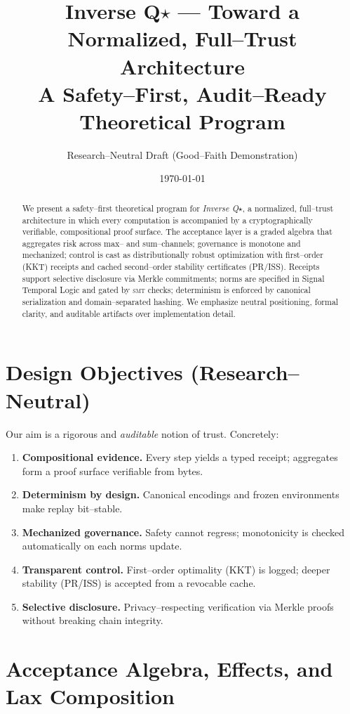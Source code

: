 \documentclass[11pt]{article}
\title{\vspace{-6pt}Inverse Q$\star$ --- Toward a Normalized, Full--Trust Architecture\\[2pt]
\large A Safety--First, Audit--Ready Theoretical Program}
\author{Research--Neutral Draft (Good--Faith Demonstration)}
\date{\today}
\theoremstyle{plain}
\theoremstyle{definition}
\theoremstyle{remark}
\begin{document}
\maketitle

\begin{abstract}
We present a safety--first theoretical program for \emph{Inverse Q$\star$}, a normalized, full--trust architecture in which every computation is accompanied by a cryptographically verifiable, compositional proof surface. The acceptance layer is a graded algebra that aggregates risk across max-- and sum--channels; governance is monotone and mechanized; control is cast as distributionally robust optimization with first--order (KKT) receipts and cached second--order stability certificates (PR/ISS). Receipts support selective disclosure via Merkle commitments; norms are specified in Signal Temporal Logic and gated by \textsc{smt} checks; determinism is enforced by canonical serialization and domain--separated hashing. We emphasize neutral positioning, formal clarity, and auditable artifacts over implementation detail.
\end{abstract}

\section{Design Objectives (Research--Neutral)}
Our aim is a rigorous and \emph{auditable} notion of trust. Concretely:
\begin{enumerate}[leftmargin=1.3em]
  \item \textbf{Compositional evidence.} Every step yields a typed receipt; aggregates form a proof surface verifiable from bytes.
  \item \textbf{Determinism by design.} Canonical encodings and frozen environments make replay bit--stable.
  \item \textbf{Mechanized governance.} Safety cannot regress; monotonicity is checked automatically on each norms update.
  \item \textbf{Transparent control.} First--order optimality (KKT) is logged; deeper stability (PR/ISS) is accepted from a revocable cache.
  \item \textbf{Selective disclosure.} Privacy--respecting verification via Merkle proofs without breaking chain integrity.
\end{enumerate}

\section{Acceptance Algebra, Effects, and Lax Composition}
\end{document}

